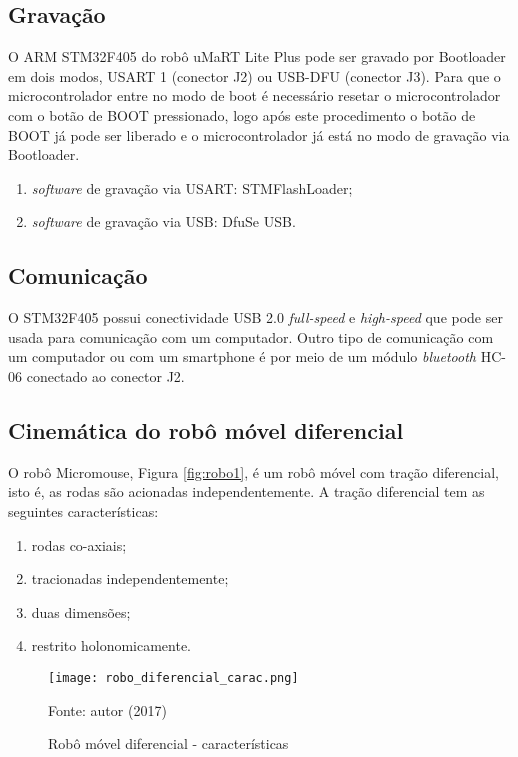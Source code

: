 \subsection{Gravação}
O ARM STM32F405 do robô uMaRT Lite Plus pode ser gravado por Bootloader em dois modos, USART 1 (conector J2) ou USB-DFU (conector J3). Para que o microcontrolador entre no modo de boot é necessário resetar o microcontrolador com o botão de BOOT pressionado, logo após este procedimento o botão de BOOT já pode ser liberado e o microcontrolador já está no modo de gravação via Bootloader. 
\begin{enumerate}[leftmargin=2cm,label=\alph*)]
\item \textit{software} de gravação via USART: STMFlashLoader;
\item \textit{software} de gravação via USB: DfuSe USB.
\end{enumerate}

\subsection{Comunicação}
O STM32F405 possui conectividade USB 2.0 \textit{full-speed} e \textit{high-speed} que pode ser usada para comunicação com um computador.
Outro tipo de comunicação com um computador ou com um smartphone é por meio de um módulo \textit{bluetooth} HC-06 conectado ao conector J2.

\subsection{Cinemática do robô móvel diferencial}
O robô Micromouse, Figura \ref{fig:robo1}, é um robô móvel com tração diferencial, isto é, as rodas são acionadas independentemente. A tração diferencial tem as seguintes características:
\begin{enumerate}[leftmargin=2cm,label=\alph*)]
	\item rodas co-axiais;
	\item tracionadas independentemente;
	\item duas dimensões;
	\item restrito holonomicamente.
\end{enumerate}

\begin{figure}[!hb]
	\caption{\label{fig:robo_dif_carac}Robô móvel diferencial - características}
	\begin{center}
		\texttt{[image: robo\_diferencial\_carac.png]}
	\end{center}
	\centering
	\small Fonte: autor (2017)
\end{figure}


